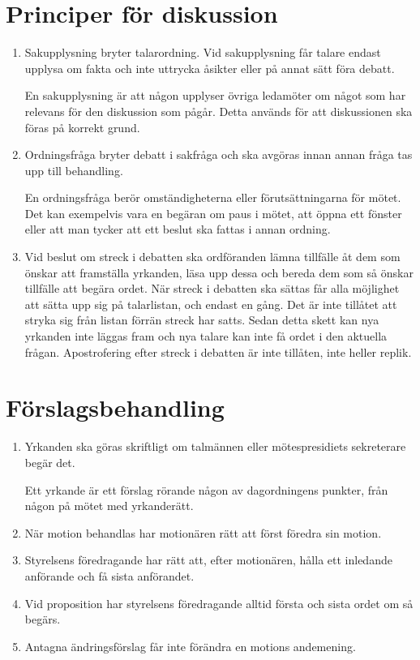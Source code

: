 \documentclass{dvd}
\begin{document}
	\section{Principer för diskussion}

	\begin{enumerate}[label=\arabic* §, ref=\arabic*]
		\item Sakupplysning bryter talarordning.
		Vid sakupplysning får talare endast upplysa om fakta och inte uttrycka åsikter eller på annat sätt föra debatt.

		En sakupplysning är att någon upplyser övriga ledamöter om något som har relevans för den diskussion som pågår.
		Detta används för att diskussionen ska föras på korrekt grund.

		\item Ordningsfråga bryter debatt i sakfråga och ska avgöras innan annan fråga tas upp till behandling.

		En ordningsfråga berör omständigheterna eller förutsättningarna för mötet.
		Det kan exempelvis vara en begäran om paus i mötet, att öppna ett fönster eller att man tycker att ett beslut ska fattas i annan ordning.

		\item  Vid beslut om streck i debatten ska ordföranden lämna tillfälle åt dem som önskar att framställa yrkanden, läsa upp dessa och bereda dem som så önskar tillfälle att begära ordet.
		När streck i debatten ska sättas får alla möjlighet att sätta upp sig på talarlistan, och endast en gång.
		Det är inte tillåtet att stryka sig från listan förrän streck har satts.
		Sedan detta skett kan nya yrkanden inte läggas fram och nya talare kan inte få ordet i den aktuella frågan.
		Apostrofering efter streck i debatten är inte tillåten, inte heller replik.
	\end{enumerate}

	\section{Förslagsbehandling}

	\begin{enumerate}[label=\arabic* §, ref=\arabic*]
		\item Yrkanden ska göras skriftligt om talmännen eller mötespresidiets sekreterare begär det.

		Ett yrkande är ett förslag rörande någon av dagordningens punkter, från någon på mötet med yrkanderätt.

		\item När motion behandlas har motionären rätt att först föredra sin motion.

		\item Styrelsens föredragande har rätt att, efter motionären, hålla ett inledande anförande och få sista anförandet.

		\item Vid proposition har styrelsens föredragande alltid första och sista ordet om så begärs.

		\item Antagna ändringsförslag får inte förändra en motions andemening.
	\end{enumerate}
\end{document}
